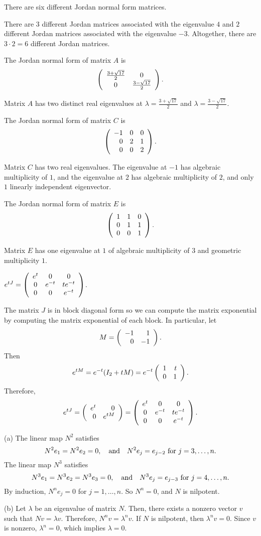 \ans There are six different Jordan normal form matrices.

\soln  There are $3$ different Jordan matrices associated with the eigenvalue $4$ and
$2$ different Jordan matrices associated with the eigenvalue $-3$.  Altogether, there
are $3\cdot 2=6$ different Jordan matrices.

\ans The Jordan normal form of matrix $A$ is
\[
\left(\begin{array}{cc} \frac{3 + \sqrt{17}}{2} & 0\\ 0 &\frac{3 - \sqrt{17}}{2}\end{array}\right).
\]

\soln Matrix $A$ has two distinct real eigenvalues at
$\lambda = \frac{3 + \sqrt{17}}{2}$ and 
$\lambda = \frac{3 - \sqrt{17}}{2}$.

\ans The Jordan normal form of matrix $C$ is
\[
\left(\begin{array}{rrr} -1 & 0 & 0 \\ 0 & 2 & 1 \\ 0 & 0 & 2\end{array}\right).
\]

\soln Matrix $C$ has two real eigenvalues.  The eigenvalue at $-1$ has
algebraic multiplicity of $1$, and the eigenvalue at $2$ has algebraic
multiplicity of $2$, and only $1$ linearly independent eigenvector.

 \ans The Jordan normal form of matrix $E$ is
\[
\left(\begin{array}{rrr} 1 & 1 & 0 \\ 0 & 1 & 1 \\ 0 & 0 & 1\end{array}\right).
\]

\soln Matrix $E$ has one eigenvalue at $1$ of algebraic multiplicity of $3$
and geometric multiplicity $1$.

 \ans $e^{tJ} =
\left(\begin{array}{ccc} e^t & 0 & 0 \\ 0 & e^{-t} & te^{-t} \\ 0 & 0 & e^{-t}\end{array}\right)$.

\soln The matrix $J$ is in block diagonal form so we can compute the
matrix exponential by computing the matrix exponential of each block.  In
particular, let 
\[
M = \left(\begin{array}{rr} -1 & 1\\ 0 &-1\end{array}\right).
\]
Then 
\[
e^{tM} = e^{-t}(I_2+tM) = e^{-t}\left(\begin{array}{rr} 1 & t\\ 0 &1\end{array}\right).
\]
Therefore,
\[
e^{tJ} = \left(\begin{array}{rr} e^t & 0\\ 0 &e^{tM}\end{array}\right) = 
\left(\begin{array}{ccc} e^t & 0 & 0 \\ 0 & e^{-t} & te^{-t} \\ 0 & 0 & e^{-t}\end{array}\right).
\]

(a) The linear map $N^2$ satisfies
\[
N^2e_1 = N^2e_2 = 0, \quad\mbox{and}\quad N^2e_j = e_{j - 2}
\mbox{ for } j = 3,\ldots,n.
\]
The linear map $N^3$ satisfies
\[
N^3e_1 = N^3e_2 = N^3e_3 = 0, \quad\mbox{and}\quad N^3e_j = e_{j - 3} \mbox{ for }
j = 4,\ldots,n.
\]
By induction, $N^ne_j = 0$ for $j = 1,\dots,n$.  So $N^n = 0$, and $N$
is nilpotent.

(b) Let $\lambda$ be an eigenvalue of matrix $N$.  Then, there
exists a nonzero vector $v$ such that $Nv = \lambda v$.  Therefore,
$N^nv = \lambda^nv$.  If $N$ is nilpotent, then $\lambda^nv = 0$.  Since
$v$ is nonzero, $\lambda^n = 0$, which implies $\lambda = 0$.


